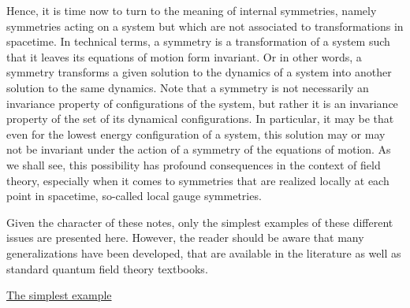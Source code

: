\documentclass[a4paper,11pt]{article}
\begin{document}
Hence, it is time now to turn to the meaning of internal symmetries, namely
symmetries acting on a system but which are not associated to transformations
in spacetime. In technical terms, a symmetry is a transformation of a
system such that it leaves its equations of motion form invariant. Or in
other words, a symmetry transforms a given solution to the dynamics of
a system into another solution to the same dynamics. Note that a symmetry
is not necessarily an invariance property of configurations of the system,
but rather it is an invariance property of the set of its dynamical
configurations. In particular, it may be that even for the lowest
energy configuration of a system, this solution may or may not be invariant
under the action of a symmetry of the equations of motion. As we shall see,
this possibility has profound consequences in the context of field theory,
especially when it comes to symmetries that are realized locally at each
point in spacetime, so-called local gauge symmetries.

Given the character of these notes, only the simplest examples of these
different issues are presented here. However, the reader should be aware
that many generalizations have been developed, that are available in the
literature as well as standard quantum field theory textbooks.

\vspace{10pt}

\noindent\underline{The simplest example}

\vspace{5pt}
\end{document}
